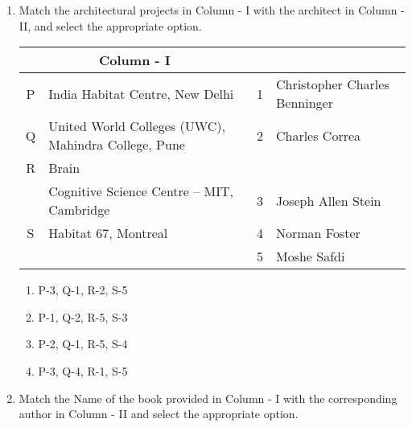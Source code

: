 \documentclass[12pt]{article}
\begin{document}
\begin{enumerate}[label=Q.\arabic*,start=26]
		\begin{multicols}{2}
			\begin{enumerate}
				\item P-4, Q-1, R-2, S-5
				\item P-2, Q-5, R-3, S-1
				\item P-3, Q-5, R-4, S-2
				\item P-3, Q-1, R-4, S-2
			\end{enumerate}
		\end{multicols}
	\item Match the architectural projects in Column - I with the architect in Column - II, and select the appropriate option.

		\begin{center}
			\begin{tabular}{|c|>{\raggedright\arraybackslash}p{4cm}|c|>{\raggedright\arraybackslash}p{6cm}|}
				\hline
				\multicolumn{2}{|c|}{\textbf{Column - I}} & \multicolumn{2}{c|}{\textbf{Column - II}} \\
				\hline
				P & India Habitat Centre, New Delhi & 1 & Christopher Charles Benninger \\
				\hline
				Q & United World Colleges (UWC), Mahindra College, Pune & 2 & Charles Correa \\ 
				\hline
				R & Brain \\& Cognitive Science Centre – MIT, Cambridge & 3 & Joseph Allen Stein \\
				\hline
				S & Habitat 67, Montreal & 4 & Norman Foster \\
				\hline
				& & 5 & Moshe Safdi \\
				\hline
			\end{tabular}
		\end{center}
		\begin{multicols}{2}
			\begin{enumerate}
				\item P-3, Q-1, R-2, S-5
				\item P-1, Q-2, R-5, S-3
				\item P-2, Q-1, R-5, S-4
				\item P-3, Q-4, R-1, S-5
			\end{enumerate}
		\end{multicols}
		\newpage
	\item Match the Name of the book provided in Column - I with the corresponding author in Column - II and select the appropriate option.
		\begin{center}
			\begin{tabular}{|c|>{\raggedright\arraybackslash}p{5.8cm}|c|>{\raggedright\arraybackslash}p{5.8cm}|}

\end{tabular}
\end{center}
\end{enumerate}
\end{document}
